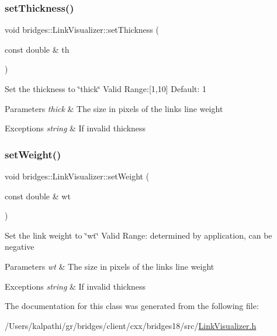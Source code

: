 \subsubsection{\texorpdfstring{set\+Thickness()}{setThickness()}}
{\footnotesize\ttfamily void bridges\+::\+Link\+Visualizer\+::set\+Thickness (\begin{DoxyParamCaption}\item[{const double \&}]{th }\end{DoxyParamCaption})\hspace{0.3cm}{\ttfamily [inline]}}

Set the thickness to \char`\"{}thick\char`\"{} Valid Range\+:\mbox{[}1,10\mbox{]} Default\+: 1


\begin{DoxyParams}{Parameters}
{\em thick} & The size in pixels of the link\textquotesingle{}s line weight \\
\hline
\end{DoxyParams}

\begin{DoxyExceptions}{Exceptions}
{\em string} & If invalid thickness \\
\hline
\end{DoxyExceptions}
\mbox{\label{classbridges_1_1_link_visualizer_a08b606d2451026a11e110d0b94f97538}} 
\subsubsection{\texorpdfstring{set\+Weight()}{setWeight()}}
{\footnotesize\ttfamily void bridges\+::\+Link\+Visualizer\+::set\+Weight (\begin{DoxyParamCaption}\item[{const double \&}]{wt }\end{DoxyParamCaption})\hspace{0.3cm}{\ttfamily [inline]}}

Set the link weight to \char`\"{}wt\char`\"{} Valid Range\+: determined by application, can be negative


\begin{DoxyParams}{Parameters}
{\em wt} & The size in pixels of the link\textquotesingle{}s line weight \\
\hline
\end{DoxyParams}

\begin{DoxyExceptions}{Exceptions}
{\em string} & If invalid thickness \\
\hline
\end{DoxyExceptions}


The documentation for this class was generated from the following file\+:\begin{DoxyCompactItemize}
\item 
/\+Users/kalpathi/gr/bridges/client/cxx/bridges18/src/\mbox{\hyperlink{_link_visualizer_8h}{Link\+Visualizer.\+h}}\end{DoxyCompactItemize}
